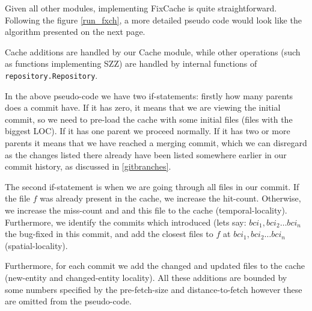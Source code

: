 \documentclass[12pt,twoside,notitlepage]{report}
\newcommand{\fxch}{FixCache}
\begin{document}
Given all other modules, implementing \fxch{} is quite straightforward. Following the figure \ref{run_fxch}, a more detailed pseudo code would look like the algorithm presented on the next page.
\clearpage
\begin{algorithm}[H]
\caption{Pseudo-code for \fxch{}.}
\label{fxch_psd}
\end{algorithm}
\vspace{1em}
Cache additions are handled by our Cache module, while other operations (such as functions implementing SZZ) are handled by internal functions of \texttt{repository.Repository}.

In the above pseudo-code we have two if-statements: firstly how many parents does a commit have. If it has zero, it means that we are viewing the initial commit, so we need to pre-load the cache with some initial files (files with the biggest LOC). If it has one parent we proceed normally. If it has two or more parents it means that we have reached a merging commit, which we can disregard as the changes listed there already have been listed somewhere earlier in our commit history, as discussed in \ref{gitbranches}.

The second if-statement is when we are going through all files in our commit. If the file $f$ was already present in the cache, we increase the hit-count. Otherwise, we increase the miss-count and and this file to the cache (temporal-locality). Furthermore, we identify the commits which introduced (lets say: $bci_1, bci_2 \dots bci_n$ the bug-fixed in this commit, and add the closest files to $f$ at $bci_1, bci_2 \dots bci_n$ (spatial-locality).

Furthermore, for each commit we add the changed and updated files to the cache (new-entity and changed-entity locality). All these additions are bounded by some numbers specified by the pre-fetch-size and distance-to-fetch however these are omitted from the pseudo-code.
\end{document}
